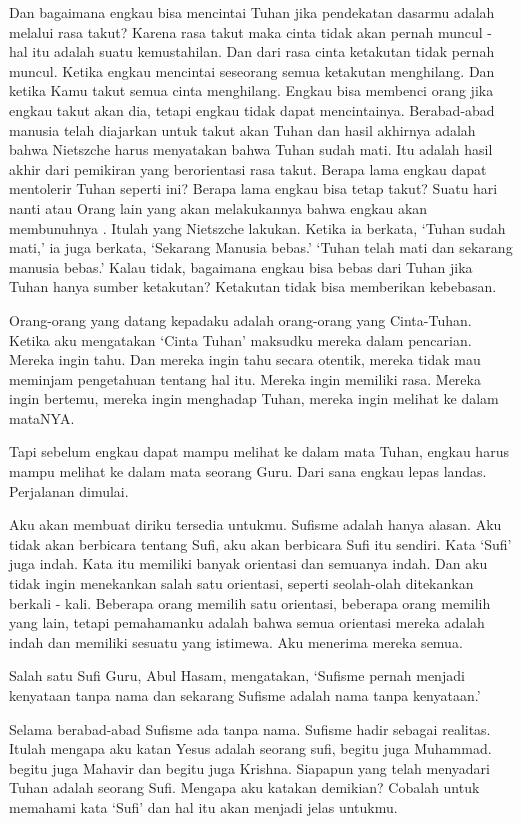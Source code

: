 Dan bagaimana engkau bisa mencintai Tuhan jika pendekatan dasarmu adalah melalui rasa takut? Karena rasa takut maka cinta tidak akan pernah muncul - hal itu adalah suatu kemustahilan. Dan dari rasa cinta ketakutan tidak pernah muncul. Ketika engkau mencintai seseorang semua ketakutan menghilang.
Dan ketika Kamu takut semua cinta menghilang. Engkau bisa membenci orang jika engkau takut akan dia, tetapi engkau tidak dapat mencintainya. Berabad-abad manusia telah diajarkan untuk takut akan Tuhan dan hasil akhirnya adalah bahwa Nietszche harus menyatakan bahwa Tuhan sudah mati. Itu adalah hasil akhir dari pemikiran yang berorientasi rasa takut. Berapa lama engkau dapat mentolerir Tuhan seperti ini? Berapa lama engkau bisa tetap takut? Suatu hari nanti atau Orang lain yang akan melakukannya bahwa engkau akan membunuhnya . Itulah yang Nietszche lakukan. Ketika ia berkata, ‘Tuhan sudah mati,’ ia juga berkata, ‘Sekarang Manusia bebas.’ ‘Tuhan telah mati dan sekarang manusia bebas.’ Kalau tidak, bagaimana engkau bisa bebas dari Tuhan jika Tuhan hanya sumber ketakutan? Ketakutan tidak bisa memberikan kebebasan.

Orang-orang yang datang kepadaku adalah orang-orang yang Cinta-Tuhan. Ketika aku mengatakan ‘Cinta Tuhan’ maksudku mereka dalam pencarian. Mereka ingin tahu. Dan mereka ingin tahu secara otentik, mereka tidak mau meminjam pengetahuan tentang hal itu. Mereka ingin memiliki rasa. Mereka ingin bertemu, mereka ingin menghadap Tuhan, mereka ingin melihat ke dalam mataNYA.

Tapi sebelum engkau dapat mampu melihat ke dalam mata Tuhan, engkau harus mampu melihat ke dalam mata seorang Guru. Dari sana engkau lepas landas. Perjalanan dimulai.

Aku akan membuat diriku tersedia untukmu. Sufisme adalah hanya alasan. Aku tidak akan berbicara tentang Sufi, aku akan berbicara Sufi itu sendiri. Kata ‘Sufi’ juga indah. Kata itu memiliki banyak orientasi dan semuanya indah. Dan aku tidak ingin menekankan salah satu orientasi, seperti seolah-olah ditekankan berkali - kali. Beberapa orang memilih satu orientasi, beberapa orang memilih yang lain, tetapi pemahamanku adalah bahwa semua orientasi mereka adalah indah dan memiliki sesuatu yang istimewa. Aku menerima mereka semua.

Salah satu Sufi Guru, Abul Hasam, mengatakan, ‘Sufisme pernah menjadi kenyataan tanpa nama dan sekarang Sufisme adalah nama tanpa kenyataan.’

Selama berabad-abad Sufisme ada tanpa nama. Sufisme hadir sebagai realitas. Itulah mengapa aku katan Yesus adalah seorang sufi, begitu juga Muhammad. begitu juga Mahavir dan begitu juga Krishna. Siapapun yang telah menyadari Tuhan adalah seorang Sufi. Mengapa aku katakan demikian? Cobalah untuk memahami kata ‘Sufi’ dan hal itu akan menjadi jelas untukmu.

